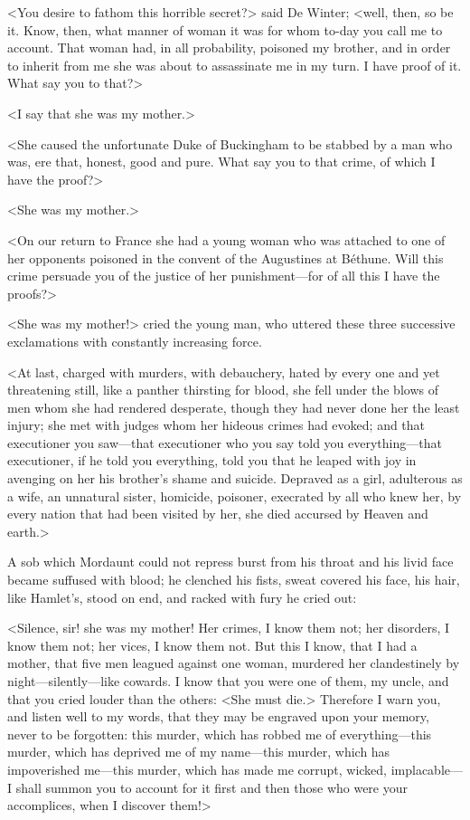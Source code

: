 <You desire to fathom this horrible secret?> said De Winter; <well, then, so be it. Know, then, what manner of woman it was for whom to-day you call me to account. That woman had, in all probability, poisoned my brother, and in order to inherit from me she was about to assassinate me in my turn. I have proof of it. What say you to that?>

<I say that she was my mother.>

<She caused the unfortunate Duke of Buckingham to be stabbed by a man who was, ere that, honest, good and pure. What say you to that crime, of which I have the proof?>

<She was my mother.>

<On our return to France she had a young woman who was attached to one of her opponents poisoned in the convent of the Augustines at Béthune. Will this crime persuade you of the justice of her punishment—for of all this I have the proofs?>

<She was my mother!> cried the young man, who uttered these three successive exclamations with constantly increasing force.

<At last, charged with murders, with debauchery, hated by every one and yet threatening still, like a panther thirsting for blood, she fell under the blows of men whom she had rendered desperate, though they had never done her the least injury; she met with judges whom her hideous crimes had evoked; and that executioner you saw—that executioner who you say told you everything—that executioner, if he told you everything, told you that he leaped with joy in avenging on her his brother's shame and suicide. Depraved as a girl, adulterous as a wife, an unnatural sister, homicide, poisoner, execrated by all who knew her, by every nation that had been visited by her, she died accursed by Heaven and earth.>

A sob which Mordaunt could not repress burst from his throat and his livid face became suffused with blood; he clenched his fists, sweat covered his face, his hair, like Hamlet's, stood on end, and racked with fury he cried out:

<Silence, sir! she was my mother! Her crimes, I know them not; her disorders, I know them not; her vices, I know them not. But this I know, that I had a mother, that five men leagued against one woman, murdered her clandestinely by night—silently—like cowards. I know that you were one of them, my uncle, and that you cried louder than the others: <She must die.> Therefore I warn you, and listen well to my words, that they may be engraved upon your memory, never to be forgotten: this murder, which has robbed me of everything—this murder, which has deprived me of my name—this murder, which has impoverished me—this murder, which has made me corrupt, wicked, implacable—I shall summon you to account for it first and then those who were your accomplices, when I discover them!>

